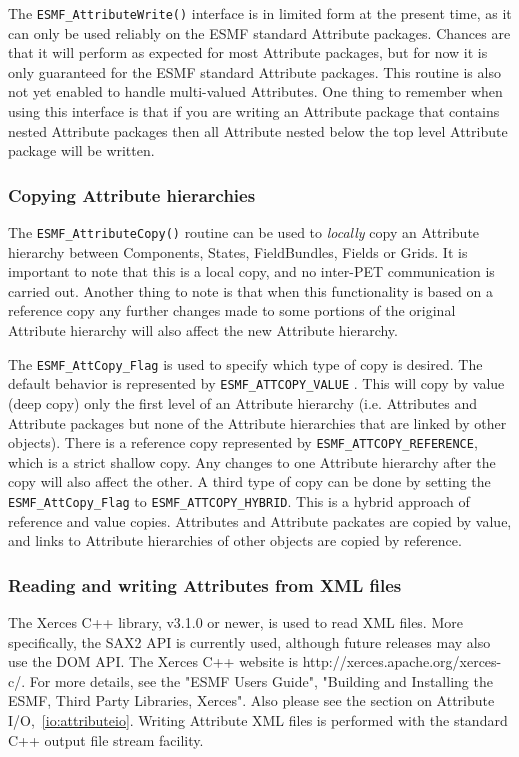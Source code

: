 The {\tt ESMF\_AttributeWrite()} interface is in limited form at the present time, as it can only be used reliably on the ESMF standard Attribute packages.  Chances are that it will perform as expected for most Attribute packages, but for now it is only guaranteed for the ESMF standard Attribute packages.  This routine is also not yet enabled to handle multi-valued Attributes.    One thing to remember when using this interface is that if you are writing an Attribute package that contains nested Attribute packages then all Attribute nested below the top level Attribute package will be written.

\subsubsection{Copying Attribute hierarchies}
\label{sec:Att:Copy}

The {\tt ESMF\_AttributeCopy()} routine can be used to {\it locally} copy an Attribute hierarchy between Components, States, FieldBundles, Fields or Grids.  It is important to note that this is a local copy, and no inter-PET communication is carried out.  Another thing to note is that when this functionality is based on a reference copy any further changes made to some portions of the original Attribute hierarchy will also affect the new Attribute hierarchy.

The {\tt ESMF\_AttCopy\_Flag} is used to specify which type of copy is desired. The default behavior is represented by {\tt ESMF\_ATTCOPY\_VALUE} . This will copy by value (deep copy) only the first level of an Attribute hierarchy (i.e. Attributes and Attribute packages but none of the Attribute hierarchies that are linked by other objects). There is a reference copy represented by {\tt ESMF\_ATTCOPY\_REFERENCE}, which is a strict shallow copy. Any changes to one Attribute hierarchy after the copy will also affect the other. A third type of copy can be done by setting the {\tt ESMF\_AttCopy\_Flag} to {\tt ESMF\_ATTCOPY\_HYBRID}. This is a hybrid approach of reference and value copies. Attributes and Attribute packates are copied by value, and links to Attribute hierarchies of other objects are copied by reference.

\subsubsection{Reading and writing Attributes from XML files}
\label{Att:Xerces}

\begin{sloppypar}
The Xerces C++ library, v3.1.0 or newer, is used to read XML files.
More specifically, the SAX2 API is currently used, although future releases may 
also use the DOM API.  The Xerces C++ website is 
http://xerces.apache.org/xerces-c/.  For more details, see the 
"ESMF Users Guide", "Building and Installing the ESMF, Third Party Libraries,
Xerces".  Also please see the section on Attribute I/O,~\ref{io:attributeio}.  
Writing Attribute XML files is performed with the standard C++ output file 
stream facility.
\end{sloppypar}

